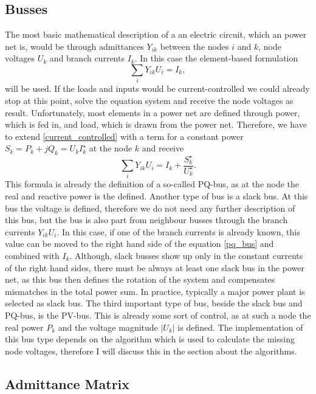 \subsection{Busses}

The most basic mathematical description of a an electric circuit, which an power net is, would be through admittances $Y_{ik}$ between the nodes $i$ and $k$, node voltages $U_k$ and branch currents $I_k$. In this case the element-based formulation
\begin{equation}
	\sum_i Y_{ik} U_i = I_k,
	\label{eq:current_controlled}
\end{equation}
will be used. If the loads and inputs would be current-controlled we could already stop at this point, solve the equation system and receive the node voltages as result. Unfortunately, most elements in a power net are defined through power, which is fed in, and load, which is drawn from the power net. Therefore, we have to extend \eqref{current_controlled} with a term for a constant power $S_k = P_k + j Q_k = U_k I_k^\star$ at the node $k$ and receive
\begin{equation}
	\sum_i Y_{ik} U_i = I_k + \frac{S_k^\star}{U_k^\star}.
	\label{eq:pq_bus}
\end{equation}
This formula is already the definition of a so-called PQ-bus, as at the node the real and reactive power is the defined.
Another type of bus is a slack bus. At this bus the voltage is defined, therefore we do not need any further description of this bus, but the bus is also part from neighbour busses through the branch currents $Y_{ik} U_i$. In this case, if one of the branch currents is already known, this value can be moved to the right hand side of the equation \eqref{pq_bus} and combined with $I_k$. Although, slack busses show up only in the constant currents of the right hand sides, there must be always at least one slack bus in the power net, as this bus then defines the rotation of the system and compensates mismatches in the total power sum. In practice, typically a major power plant is selected as slack bus.
The third important type of bus, beside the slack bus and PQ-bus, is the PV-bus. This is already some sort of control, as at such a node the real power $P_k$ and the voltage magnitude $|U_k|$ is defined. The implementation of this bus type depends on the algorithm which is used to calculate the missing node voltages, therefore I will discuss this in the section about the algorithms.

\subsection{Admittance Matrix}

